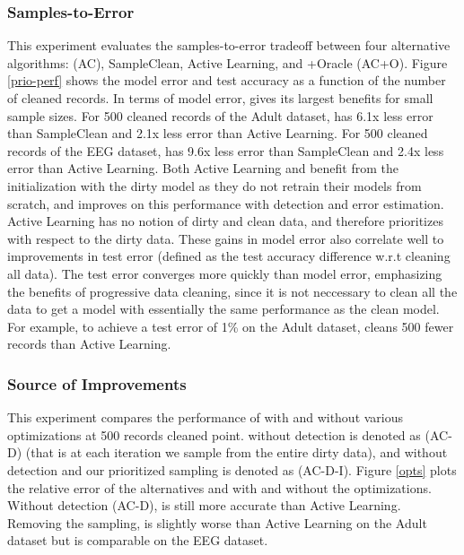 \subsubsection{Samples-to-Error}
This experiment evaluates the samples-to-error tradeoff between four alternative algorithms: \sys (AC), SampleClean, Active Learning, and \sys+Oracle (AC+O).
Figure \ref{prio-perf} shows the model error and test accuracy as a function of the number of cleaned records.
In terms of model error, \sys gives its largest benefits for small sample sizes.
For 500 cleaned records of the Adult dataset, \sys has 6.1x less error than SampleClean and 2.1x less error than Active Learning.
For 500 cleaned records of the EEG dataset, \sys has 9.6x less error than SampleClean and 2.4x less error than Active Learning.
Both Active Learning and \sys benefit from the initialization with the dirty model as they do not retrain their models from scratch, and \sys improves on this performance with detection and error estimation.
Active Learning has no notion of dirty and clean data, and therefore prioritizes with respect to the dirty data.
These gains in model error also correlate well to improvements in test error (defined as the test accuracy difference w.r.t cleaning all data).
The test error converges more quickly than model error, emphasizing the benefits of progressive data cleaning, since it is not neccessary to clean all the data to get a model with essentially the same performance as the clean model.
For example, to achieve a test error of 1\% on the Adult dataset, \sys cleans 500 fewer records than Active Learning.
\fi

\subsubsection{Source of Improvements}\label{comp}
This experiment compares the performance of \sys with and without various optimizations at 500 records cleaned point. 
\sys without detection is denoted as (AC-D) (that is at each iteration we sample from the entire dirty data), and \sys without detection and our prioritized sampling is denoted as (AC-D-I).
Figure \ref{opts} plots the relative error of the alternatives and \sys with and without the optimizations.
Without detection (AC-D), \sys is still more accurate than Active Learning.
Removing the sampling, \sys is slightly worse than Active Learning on the Adult dataset but is comparable on the EEG dataset.

